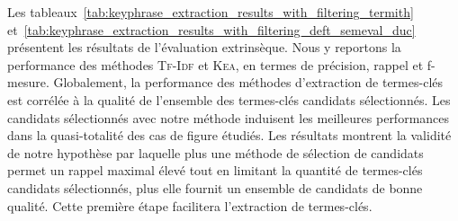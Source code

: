         Les
        tableaux~\ref{tab:keyphrase_extraction_results_with_filtering_termith}
        et~\ref{tab:keyphrase_extraction_results_with_filtering_deft_semeval_duc}
        présentent les résultats de l'évaluation extrinsèque. Nous y reportons
        la performance des méthodes \textsc{Tf-Idf} et \textsc{Kea}, en termes
        de précision, rappel et f-mesure.
        Globalement, la performance des méthodes d'extraction de termes-clés est
        corrélée à la qualité de l'ensemble des termes-clés candidats
        sélectionnés. Les candidats sélectionnés avec notre méthode induisent
        les meilleures performances dans la quasi-totalité des cas de figure
        étudiés. Les résultats
        montrent la validité de notre hypothèse par laquelle plus une méthode de
        sélection de candidats permet un rappel maximal élevé tout en limitant
        la quantité de termes-clés candidats sélectionnés, plus
        elle fournit un ensemble de candidats de bonne qualité. Cette première
        étape facilitera l'extraction de termes-clés.
